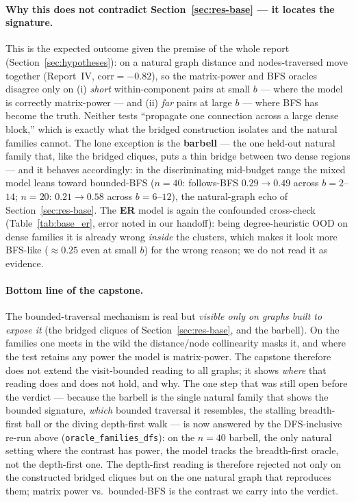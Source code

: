 \documentclass[11pt,a4paper]{article}
\begin{document}
\paragraph{Why this does not contradict Section~\ref{sec:res-base} --- it locates the signature.}
This is the expected outcome given the premise of the whole report (Section~\ref{sec:hypotheses}):
on a natural graph distance and nodes-traversed move together (Report~IV, $\mathrm{corr}=-0.82$), so
the matrix-power and BFS oracles disagree only on (i) \emph{short} within-component pairs at small
$b$ --- where the model is correctly matrix-power --- and (ii) \emph{far} pairs at large $b$ --- where
BFS has become the truth. Neither tests ``propagate one connection across a large dense block,''
which is exactly what the bridged construction isolates and the natural families cannot. The lone
exception is the \textbf{barbell} --- the one held-out natural family that, like the bridged cliques,
puts a thin bridge between two dense regions --- and it behaves accordingly: in the discriminating
mid-budget range the mixed model leans toward bounded-BFS ($n=40$: follows-BFS $0.29\to0.49$ across
$b=2$--$14$; $n=20$: $0.21\to0.58$ across $b=6$--$12$), the natural-graph echo of
Section~\ref{sec:res-base}. The \textbf{ER} model is again the confounded cross-check
(Table~\ref{tab:base_er}, error noted in our handoff): being degree-heuristic OOD on dense families
it is already wrong \emph{inside} the clusters, which makes it look more BFS-like ($\approx0.25$
even at small $b$) for the wrong reason; we do not read it as evidence.

\paragraph{Bottom line of the capstone.} The bounded-traversal mechanism is real but \emph{visible
only on graphs built to expose it} (the bridged cliques of Section~\ref{sec:res-base}, and the
barbell). On the families one meets in the wild the distance/node collinearity masks it, and where
the test retains any power the model is matrix-power. The capstone therefore does not extend the
visit-bounded reading to all graphs; it shows \emph{where} that reading does and does not hold, and
why. The one step that was still open before the verdict --- because the barbell is the single natural
family that shows the bounded signature, \emph{which} bounded traversal it resembles, the stalling
breadth-first ball or the diving depth-first walk --- is now answered by the DFS-inclusive re-run above
(\texttt{oracle\_families\_dfs}): on the $n=40$ barbell, the only natural setting where the contrast has
power, the model tracks the breadth-first oracle, not the depth-first one. The depth-first reading is
therefore rejected not only on the constructed bridged cliques but on the one natural graph that
reproduces them; matrix power vs.\ bounded-BFS is the contrast we carry into the verdict.
\end{document}
